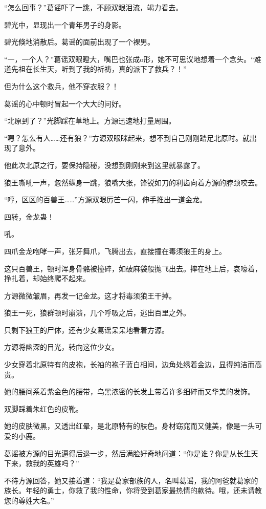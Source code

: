 \begin{this_body}
“怎么回事？”葛谣吓了一跳，不顾双眼泪流，竭力看去。

碧光中，显现出一个青年男子的身影。

碧光倏地消散后。葛谣的面前出现了一个裸男。

“一，一个人？”葛谣双眼瞪大，嘴巴也张成o形，她不可思议地想着一个念头。“难道先祖在长生天，听到了我的祈祷，真的派下了救兵？！”

但为什么这个救兵，他不穿衣服？！

葛谣的心中顿时冒起一个大大的问好。

“北原到了？”光脚踩在草地上。方源迅速地打量周围。

“嗯？怎么有人……还有狼？”方源双眼眯起来，想不到自己刚刚踏足北原时。就出现了意外。

他此次北原之行，要保持隐秘，没想到刚刚来到这里就暴露了。

狼王嘶吼一声，忽然纵身一跳，狼嘴大张，锋锐如刀的利齿向着方源的脖颈咬去。

“哼，区区的百兽王……”方源双眼厉芒一闪，伸手推出一道金龙。

四转，金龙蛊！

吼。

四爪金龙咆哮一声，张牙舞爪，飞腾出去，直接撞在毒须狼王的身上。

这只百兽王，顿时浑身骨骼被撞碎，如破麻袋般抛飞出去。摔在地上后，哀嚎着，挣扎着，却始终爬不起来。

方源微微皱眉，再发一记金龙。这才将毒须狼王干掉。

狼王一死，狼群顿时崩溃，几个呼吸之后，逃出百里之外。

只剩下狼王的尸体，还有少女葛谣呆呆地看着方源。

方源将幽深的目光，转向这位少女。

少女穿着北原特有的皮袍，长袖的袍子蓝白相间，边角处绣着金边，显得纯洁而高贵。

她的腰间系着紫金色的腰带，乌黑浓密的长发上带着许多细碎而又华美的发饰。

双脚踩着朱红色的皮靴。

她的皮肤微黑，又透出红晕，是北原特有的肤色。身材窈窕而又健美，像是一头可爱的小鹿。

葛谣被方源的目光逼得后退一步，然后满脸好奇地问道：“你是谁？你是从长生天下来，救我的英雄吗？”

不待方源回答，她又接着道：“我是葛家部族的人，名叫葛谣，我的阿爸就葛家的族长。年轻的勇士，你救了我的性命，你将受到葛家最热情的款待。哦，还未请教您的尊姓大名。”


\end{this_body}
